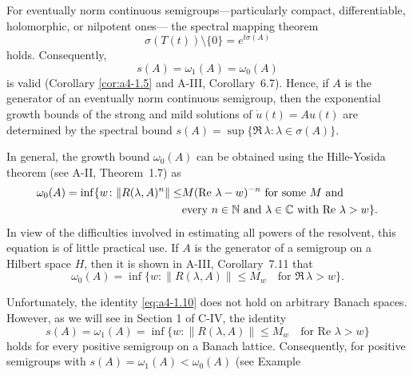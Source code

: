 \begin{remark}\label{rem:a4-1.7}
For eventually norm continuous semigroups---particularly compact, differentiable, holomorphic, or nilpotent ones--- the spectral mapping theorem 
\begin{equation}\label{eq:a4-1.7}
\sigma(T(t)) \setminus \{0\} = e^{t \sigma(A)}
\end{equation}
holds. 
Consequently,
\begin{equation}\label{eq:a4-1.8}
s(A) = \omega_1(A) = \omega_{0}(A)
\end{equation}
is valid (Corollary \ref{cor:a4-1.5} and A-III, Corollary~6.7).
Hence, if $A$ is the generator of an eventually norm continuous semigroup, then the exponential growth bounds of the strong and mild solutions of $\dot{u}(t) = A u(t)$ are determined by the spectral bound
$s(A) = \sup\{\Re\,\lambda\colon\lambda \in \sigma(A)\}.$
\end{remark}
\begin{remark} In general, the growth bound $\omega_{0}(A)$ can be obtained using the Hille-Yosida theorem (see A-II, Theorem~1.7) as
\begin{align}\label{eq:a4-1.9}
\omega_{0}(A) = \inf \{ w\colon\|R(\lambda, A)^n\| \leq &M ( \mathop{}\!\mathrm{Re}\,\,\lambda - w)^{-n} \text{ for some } M \text{ and}\\
&\text{every } n \in \mathbb{N} \text{ and } \lambda \in \mathbb{C} \text{ with } \text{Re } \lambda > w\}.\notag
\end{align}
In view of the difficulties involved in estimating all powers of the resolvent, this equation is of little practical use. 
If $A$ is the generator of a semigroup on a Hilbert space $H$, then it is shown in A-III, Corollary~7.11 that
\begin{equation}\label{eq:a4-1.10}
 \omega_{0}(A) = \inf \{ w\colon\| R(\lambda, A) \| \leq M_w \quad \text{for } \Re\,\lambda > w \}.
\end{equation}
\end{remark}
Unfortunately, the identity \eqref{eq:a4-1.10} does not hold on arbitrary Banach spaces. 
However, as we will see in Section 1 of C-IV, the identity 
\begin{equation}\label{eq:a4-1.11}
 s(A)=\omega_1(A) = \inf \{ w\colon\| R(\lambda, A) \| \leq M_w \quad \text{for } \text{Re } \lambda > w \}
\end{equation}
holds for every positive semigroup on a Banach lattice. 
Consequently, for positive semigroups with $s(A) = \omega_1(A) < \omega_{0}(A)$ (see Example 
